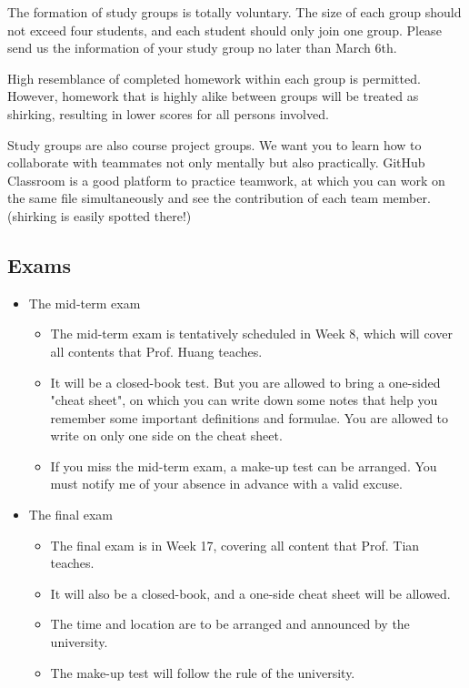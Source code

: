 \documentclass[11pt]{article}
\begin{document}
The formation of study groups is totally voluntary. The size of each
group should not exceed four students, and each student should only
join one group. Please send us the information of your study group no
later than March 6th.

High resemblance of completed homework within each group is
permitted. However, homework that is highly alike between groups will
be treated as shirking, resulting in lower scores for all persons
involved.

Study groups are also course project groups. We want you to learn how
to collaborate with teammates not only mentally but also
practically. GitHub Classroom is a good platform to practice teamwork,
at which you can work on the same file simultaneously and see the
contribution of each team member. (shirking is easily spotted there!)

\subsection*{Exams}
\label{sec:org64d83e2}

\begin{itemize}
\item The mid-term exam
\label{sec:orge1f319e}
\begin{itemize}
\item The mid-term exam is tentatively scheduled in Week 8, which will
cover all contents that Prof. Huang teaches.
\item It will be a closed-book test. But you are allowed to bring a
one-sided "cheat sheet", on which you can write down some notes that
help you remember some important definitions and formulae. You are
allowed to write on only one side on the cheat sheet.
\item If you miss the mid-term exam, a make-up test can be arranged. You
must notify me of your absence in advance with a valid excuse.
\end{itemize}

\item The final exam
\label{sec:org872df1e}
\begin{itemize}
\item The final exam is in Week 17, covering all content that Prof. Tian
teaches.
\item It will also be a closed-book, and a one-side cheat sheet will be
allowed.
\item The time and location are to be arranged and announced by the
university.
\item The make-up test will follow the rule of the university.
\end{itemize}
\end{itemize}
\end{document}
